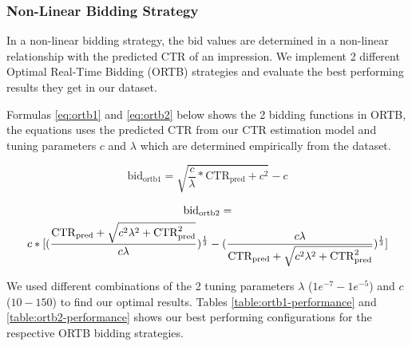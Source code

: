 \documentclass{sig-alternate-05-2015}
\begin{document}
\subsubsection{Non-Linear Bidding Strategy}
In a non-linear bidding strategy, the bid values are determined in a non-linear relationship with the predicted CTR of an impression. We implement 2 different Optimal Real-Time Bidding (ORTB) strategies \cite{zhang_optimal_2014} and evaluate the best performing results they get in our dataset.

Formulas \ref{eq:ortb1} and \ref{eq:ortb2} below shows the 2 bidding functions in ORTB, the equations uses the predicted CTR from our CTR estimation model and tuning parameters $c$ and $\lambda$ which are determined empirically from the dataset.

\begin{equation} \label{eq:ortb1}
\mathrm{bid}_\mathrm{ortb1} = \sqrt{\frac{c}{\lambda}*\mathrm{CTR}_\mathrm{pred} + c^{2}} - c
\end{equation}

{\tiny
\begin{multline} \label{eq:ortb2}
    \tiny{\mathrm{bid}_\mathrm{ortb2}} =  \\
    c * [ (\frac{\mathrm{CTR}_\mathrm{pred} + \sqrt{c^{2}\lambda^{2} + \mathrm{CTR}_\mathrm{pred}^{2}}}{c\lambda})^{\frac{1}{3}} - 
    (\frac{c\lambda}{\mathrm{CTR}_\mathrm{pred} + \sqrt{c^{2}\lambda^{2} + \mathrm{CTR}_\mathrm{pred}^{2}}})^\frac{1}{3} ]
\end{multline}
}

We used different combinations of the 2 tuning parameters $\lambda$ ($1e^{-7}-1e^{-5}$) and $c$ ($10-150$) to find our optimal results. Tables \ref{table:ortb1-performance} and \ref{table:ortb2-performance} shows our best performing configurations for the respective ORTB bidding strategies. 

\begin{table}[h!]
  \centering
	\caption{ORTB 1 Performance}
	\label{table:ortb1-performance}
\end{table}
\end{document}

